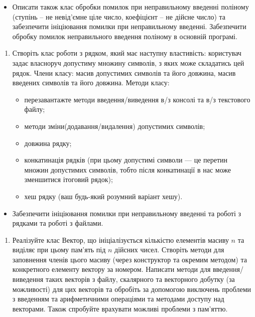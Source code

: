 \documentclass[]{article}
\begin{document}
\begin{itemize}
\item
  Описати також клас обробки помилок при неправильному введенні поліному
  (ступінь -- не невід'ємне ціле число, коефіцієнт -- не дійсне число)
  та забезпечити ініціювання помилки при неправильному введенні.
  Забезпечити обробку помилок неправильного введення поліному в основній
  програмі.
\end{itemize}

\begin{enumerate}
\def\labelenumi{\arabic{enumi}.}
\item
  Створіть клас роботи з рядком, який має наступну властивість:
  користувач задає власноруч допустиму множину символів, з яких може
  складатись цей рядок. Члени класу: масив допустимих символів та його
  довжина, масив введених символів та його довжина. Методи класу:

  \begin{itemize}
  \item
    перезавантажте методи введення/виведення в/з консолі та в/з
    текстового файлу;
  \item
    методи зміни(додавання/видалення) допустимих символів;
  \item
    довжина рядку;
  \item
    конкатинація рядків (при цьому допустимі символи --- це перетин
    множин допустимих символів, тобто після конкатинації в нас може
    зменшитися ітоговий рядок);
  \item
    хеш рядку (ваш будь-який розумний варіант хешу).
  \end{itemize}
\end{enumerate}

\begin{itemize}
\item
  Забезпечити ініціювання помилки при неправильному введенні та роботі з
  рядками та роботі з файлами.
\end{itemize}

\begin{enumerate}
\def\labelenumi{\arabic{enumi}.}
\item
  Реалізуйте клас Вектор, що ініціалізується кількістю елементів масиву
  \(n\) та виділяє при цьому пам'ять під \(n\) дійсних чисел. Створіть
  методи для заповнення членів цього масиву (через конструктор та
  окремим методом) та конкретного елементу вектору за номером. Написати
  методи для введення/виведення таких векторів з файлу, скалярного та
  векторного добутку (за можливості) для цих векторів та обробіть за
  допомогою виключень проблеми з введенням та арифметичними операціями
  та методами доступу над векторами. Також спробуйте врахувати можливі
  проблеми з пам'яттю.
\end{enumerate}
\end{document}
